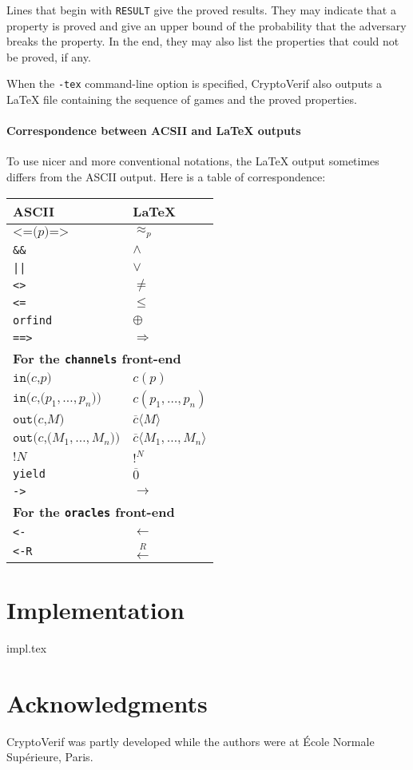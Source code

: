 \documentclass{article}
\begin{document}
Lines that begin with \texttt{RESULT} give the proved results.
They may indicate that a property is proved and give 
an upper bound of the probability that the adversary breaks
the property. 
%
In the end, they may also list the properties that could not be
proved, if any.

When the \texttt{-tex} command-line option is specified,
CryptoVerif also outputs a {\LaTeX} file containing the 
sequence of games and the proved properties.

\paragraph{Correspondence between ACSII and {\LaTeX} outputs}

To use nicer and more conventional notations, the {\LaTeX} output sometimes
differs from the ASCII output. Here is a table of correspondence:
\begin{center}
\begin{tabular}{l|l}
ASCII&{\LaTeX}\\
\hline
$\texttt{<=(}p\texttt{)=>}$& $\approx_p$\\
\texttt{\&\&}&$\wedge$\\
\texttt{||}&$\vee$\\
\texttt{<>}&$\neq$\\
\texttt{<=}&$\leq$\\
\texttt{orfind}&$\oplus$\\
\texttt{==>}&$\Longrightarrow$\\
\hline
\multicolumn{2}{l}{\textbf{For the \texttt{channels} front-end}}\\
\hline
$\texttt{in(}c\texttt{,}p\texttt{)}$& $c(p)$\\
$\texttt{in(}c\texttt{,(}p_1, \ldots, p_n\texttt{))}$& $c(p_1, \ldots, p_n)$\\
$\texttt{out(}c\texttt{,}M\texttt{)}$& $\overline{c}\langle M\rangle$\\
$\texttt{out(}c\texttt{,(}M_1, \ldots, M_n\texttt{))}$& $\overline{c}\langle M_1, \ldots, M_n\rangle$\\
$\texttt{!}N$&$!^N$\\
\texttt{yield}& $\overline{0}$\\
\texttt{->}& $\rightarrow$\\
\hline
\multicolumn{2}{l}{\textbf{For the \texttt{oracles} front-end}}\\
\hline
\texttt{<-}&$\leftarrow$\\
\texttt{<-R}&$\stackrel{R}{\leftarrow}$\\
\end{tabular}
\end{center}

\section{Implementation}
 {impl.tex}



\section*{Acknowledgments}

CryptoVerif was partly developed while the authors were at \'Ecole Normale Sup\'erieure, Paris.


\end{document}
